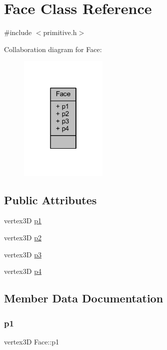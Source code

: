 \hypertarget{class_face}{}\section{Face Class Reference}
\label{class_face}


{\ttfamily \#include $<$primitive.\+h$>$}



Collaboration diagram for Face\+:
\nopagebreak
\begin{figure}[H]
\begin{center}
\leavevmode
\includegraphics[width=118pt]{class_face__coll__graph}
\end{center}
\end{figure}
\subsection*{Public Attributes}
\begin{DoxyCompactItemize}
\item 
vertex3D \mbox{\hyperlink{class_face_ad0c1698c5f8281fc3f3d3e5d12ff6ac4}{p1}}
\item 
vertex3D \mbox{\hyperlink{class_face_aa7c7c6a437774d7ff2c95fdc96ad7840}{p2}}
\item 
vertex3D \mbox{\hyperlink{class_face_a83603534660d5aea15b287d83b0aa2d8}{p3}}
\item 
vertex3D \mbox{\hyperlink{class_face_a0691e5c72ca6be50acb683e12ce1482f}{p4}}
\end{DoxyCompactItemize}


\subsection{Member Data Documentation}
\mbox{\label{class_face_ad0c1698c5f8281fc3f3d3e5d12ff6ac4}} 
\subsubsection{\texorpdfstring{p1}{p1}}
{\footnotesize\ttfamily vertex3D Face\+::p1}

